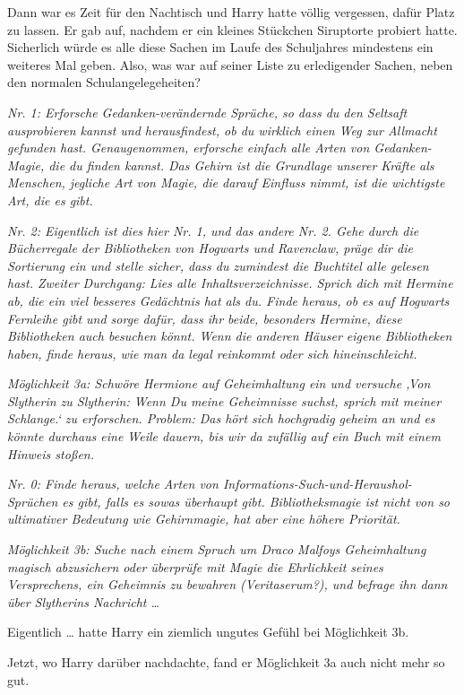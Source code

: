 Dann war es Zeit für den Nachtisch und Harry hatte völlig vergessen, dafür Platz zu lassen. Er gab auf, nachdem er ein kleines Stückchen Siruptorte probiert hatte. Sicherlich würde es alle diese Sachen im Laufe des Schuljahres mindestens ein weiteres Mal geben.
Also, was war auf seiner Liste zu erledigender Sachen, neben den normalen Schulangelegeheiten?

\emph{Nr. 1: Erforsche Gedanken-verändernde Sprüche, so dass du den Seltsaft ausprobieren kannst und herausfindest, ob du wirklich einen Weg zur Allmacht gefunden hast. Genaugenommen, erforsche einfach alle Arten von Gedanken-Magie, die du finden kannst. Das Gehirn ist die Grundlage unserer Kräfte als Menschen, jegliche Art von Magie, die darauf Einfluss nimmt, ist die wichtigste Art, die es gibt.}

\emph{Nr. 2: Eigentlich ist dies hier Nr. 1, und das andere Nr. 2. Gehe durch die Bücherregale der Bibliotheken von Hogwarts und Ravenclaw, präge dir die Sortierung ein und stelle sicher, dass du zumindest die Buchtitel alle gelesen hast. Zweiter Durchgang: Lies alle Inhaltsverzeichnisse. Sprich dich mit Hermine ab, die ein viel besseres Gedächtnis hat als du. Finde heraus, ob es auf Hogwarts Fernleihe gibt und sorge dafür, dass ihr beide, besonders Hermine, diese Bibliotheken auch besuchen könnt. Wenn die anderen Häuser eigene Bibliotheken haben, finde heraus, wie man da legal reinkommt oder sich hineinschleicht.}

\emph{Möglichkeit 3a: Schwöre Hermione auf Geheimhaltung ein und versuche ‚Von Slytherin zu Slytherin: Wenn Du meine Geheimnisse suchst, sprich mit meiner Schlange.‘ zu erforschen. Problem: Das hört sich hochgradig geheim an und es könnte durchaus eine Weile dauern, bis wir da zufällig auf ein Buch mit einem Hinweis stoßen.}

\emph{Nr. 0: Finde heraus, welche Arten von Informations-Such-und-Heraushol-Sprüchen es gibt, falls es sowas überhaupt gibt. Bibliotheksmagie ist nicht von so ultimativer Bedeutung wie Gehirnmagie, hat aber eine höhere Priorität.}

\emph{Möglichkeit 3b: Suche nach einem Spruch um Draco Malfoys Geheimhaltung magisch abzusichern oder überprüfe mit Magie die Ehrlichkeit seines Versprechens, ein Geheimnis zu bewahren (Veritaserum?), und befrage ihn dann über Slytherins Nachricht …}

Eigentlich … hatte Harry ein ziemlich ungutes Gefühl bei Möglichkeit 3b.

Jetzt, wo Harry darüber nachdachte, fand er Möglichkeit 3a auch nicht mehr so gut.

